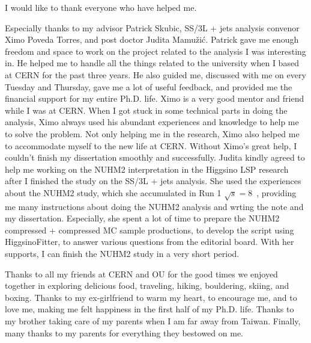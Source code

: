 I would like to thank everyone who have helped me.

Especially thanks to my advisor Patrick Skubic, SS/3L + jets analysis convenor Ximo Poveda Torres, and post doctor Judita Mamu\v{z}i\'{c}.
%
Patrick gave me enough freedom and space to work on the project related to the analysis I was interesting in.%
He helped me to handle all the things related to the university when I based at CERN for the past three years.
He also guided me, discussed with me on every Tuesday and Thursday, gave me a lot of useful feedback, and provided me the financial support for my entire Ph.D. life.
%
Ximo is a very good mentor and friend while I was at CERN.
When I got stuck in some technical parts in doing the analysis, Ximo always used his abundant experiences and knowledge to help me to solve the problem.
Not only helping me in the research, Ximo also helped me to accommodate myself to the new life at CERN.
Without Ximo's great help, I couldn't finish my dissertation smoothly and successfully.
%
Judita kindly agreed to help me working on the NUHM2 interpretation in the Higgsino LSP research after I finished the study on the SS/3L + jets analysis.
She used the experiences about the NUHM2 study, which she accumulated in Run 1 $\sqrt{s} = 8$~{\TeV}, providing me many instructions about doing the NUHM2 analysis and wrting the note and my dissertation.
Especially, she spent a lot of time to prepare the NUHM2 compressed + compressed MC sample productions, to develop the script using HiggsinoFitter, to answer various questions from the editorial board.
With her supports, I can finish the NUHM2 study in a very short period.
%

Thanks to all my friends at CERN and OU for the good times we enjoyed together in exploring delicious food, traveling, hiking, bouldering, skiing, and boxing.
Thanks to my ex-girlfriend to warm my heart, to encourage me, and to love me, making me felt happiness in the first half of my Ph.D. life.
Thanks to my brother taking care of my parents when I am far away from Taiwan.
Finally, many thanks to my parents for everything they bestowed on me.


